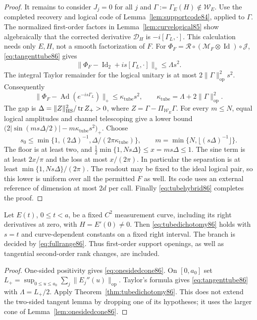 \begin{proof}
It remains to consider $J_j=0$ for all $j$ and
$\Gamma:=\Gamma_E(H)\notin\mathcal W_E$.
Use the completed recovery and logical code of
Lemma~\ref{lem:supportcode84}, applied to $\Gamma$.
The normalized first-order factors in Lemma~\ref{lem:curvelogical85}
show algebraically that the corrected derivative $\mathcal D_H$
is $-i[\Gamma_L,\cdot]$.  This calculation needs only $E,H$, not
a smooth factorization of $F$.
For $\Phi_F=\mathcal R\circ(\mathcal M_F\otimes\operatorname{Id})
\circ\mathcal J$, \eqref{eq:tangenttube86} gives
\[
 \|\Phi_F-\operatorname{Id}_2+is[\Gamma_L,\cdot]\|_\diamond
 \le\Lambda s^2.
\]
The integral Taylor remainder for the logical unitary is at most
$2\|\Gamma\|_{\mathrm{op}}^2s^2$.  Consequently
\begin{equation}\label{eq:tubelogical86}
 \|\Phi_F-\operatorname{Ad}(e^{-is\Gamma_L})\|_\diamond
 \le\kappa_{\mathrm{tube}}s^2,
 \qquad \kappa_{\mathrm{tube}}=\Lambda+2\|\Gamma\|_{\mathrm{op}}^2.
\end{equation}
The gap is $\Delta=\|Z\|_{\mathrm{HS}}^2/\operatorname{tr} Z_+>0$, where
$Z=\Gamma-\Pi_{\mathcal W_E}\Gamma$.
For every $m\le N$, equal logical amplitudes and channel telescoping
give a lower bound
$\bigl(2|\sin(ms\Delta/2)|-m\kappa_{\mathrm{tube}}s^2\bigr)_+$.
Choose
\[
 s_0\le\min\{1,(2\Delta)^{-1},
              \Delta/(2\pi\kappa_{\mathrm{tube}})\},\qquad
 m=\min\{N,\lfloor(s\Delta)^{-1}\rfloor\}.
\]
The floor is at least two, and
$\frac12\min\{1,Ns\Delta\}\le x=ms\Delta\le1$.
The sine term is at least $2x/\pi$ and the loss at most $x/(2\pi)$.
In particular the separation is at least
$\min\{1,Ns\Delta\}/(2\pi)$.
The readout may be fixed to the ideal logical pair, so this lower is
uniform over all the permitted $F$ as well.  Its code uses an external
reference of dimension at most $2d$ per call.  Finally
\eqref{eq:tubehybrid86} completes the proof.
\end{proof}

\begin{corollary}\label{cor:onesidedcurves86}
Let $E(t)$, $0\le t<a$, be a fixed $C^2$ measurement curve, including its
right derivatives at zero, with $H=E'(0)\ne0$.  Then
\eqref{eq:tubedichotomy86} holds with $s=t$ and curve-dependent
constants on a fixed right interval.  The branch is decided by
\eqref{eq:fullrange86}.  Thus first-order support openings, as well
as tangential second-order rank changes, are included.
\end{corollary}
\begin{proof}
One-sided positivity gives \eqref{eq:onesidedcone86}.
On $[0,a_0]$ set
$L_+=\sup_{0\le u\le a_0}\sum_j\|E_j''(u)\|_{\mathrm{op}}$.
Taylor's formula gives \eqref{eq:tangenttube86} with
$\Lambda=L_+/2$.  Apply Theorem~\ref{thm:tubedichotomy86}.
This does not extend the two-sided tangent lemma by dropping one of
its hypotheses; it uses the larger cone of Lemma~\ref{lem:onesidedcone86}.
\end{proof}

